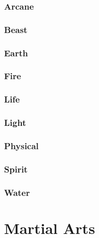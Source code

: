 \documentclass[twoside]{book}
\begin{document}
    

\subsection{Arcane}
    
    

\subsection{Beast}
    
    

\subsection{Earth}
    
    

\subsection{Fire}
    
    

\subsection{Life}
    
    

\subsection{Light}
    
    

\subsection{Physical}
    
    

\subsection{Spirit}
    
    

\subsection{Water}
    
    

\chapter{Martial Arts}
    
\end{document}
